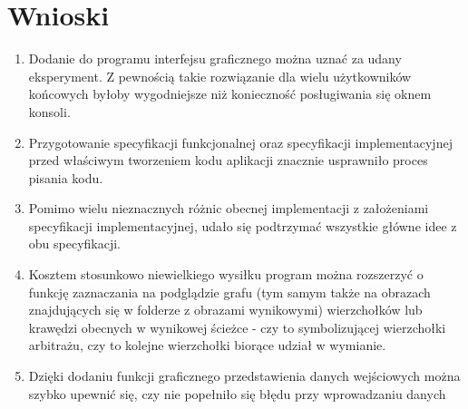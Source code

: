 \documentclass[a4paper,12pt]{article}
\begin{document}
\section{Wnioski}

\begin{enumerate}

\item Dodanie do programu interfejsu graficznego można uznać za udany eksperyment. Z pewnością takie rozwiązanie dla wielu użytkowników końcowych byłoby wygodniejsze niż konieczność posługiwania się oknem konsoli.
\item Przygotowanie specyfikacji funkcjonalnej oraz specyfikacji implementacyjnej przed właściwym tworzeniem kodu aplikacji znacznie usprawniło proces pisania kodu.
\item Pomimo wielu nieznacznych różnic obecnej implementacji z założeniami specyfikacji implementacyjnej, udało się podtrzymać wszystkie główne idee z obu specyfikacji. 
\item Kosztem stosunkowo niewielkiego wysiłku program można rozszerzyć o funkcję zaznaczania na podglądzie grafu (tym samym także na obrazach znajdujących się w folderze z obrazami wynikowymi) wierzchołków lub krawędzi obecnych w wynikowej ścieżce - czy to symbolizującej wierzchołki arbitrażu, czy to kolejne wierzchołki biorące udział w wymianie.
\item Dzięki dodaniu funkcji graficznego przedstawienia danych wejściowych można szybko upewnić się, czy nie popełniło się błędu przy wprowadzaniu danych

\end{enumerate}
\end{document}
